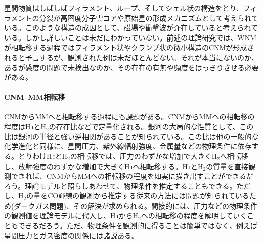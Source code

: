 星間物質はしばしばフィラメント、ループ、そしてシェル状の構造をとり、フィラメントの分裂が高密度分子雲コアや原始星の形成メカニズムとして考えられている。このような構造の成因として、磁場や衝撃波が介在していると考えられている。しかし詳しいことは未だにわかっていない。前述の理論研究\citep{2012ApJ...759...35I}では、WNMが相転移する過程ではフィラメント状やクランプ状の微小構造のCNMが形成されると予言するが、観測された例は未だほとんどない。それが本当にないのか、あるが感度の問題で未検出なのか、その存在の有無や頻度をはっきりさせる必要がある。

\paragraph{CNM--MM相転移}

CNMからMMへと相転移する過程にも課題がある。CNMからMMへの相転移の程度はH\,\textsc{i}とH$_{2}$の存在比などで定量化される。銀河の大局的な性質として、この比は銀河の半径と強い逆相関があることが知られている\citep{1995A&A...304....1H}。この比は他の一般的な化学進化と同様に、星間圧力、紫外線輻射強度、金属量などの物理条件に依存する。とりわけH\,\textsc{i}とH$_{2}$の相転移では、圧力のわずかな増加で大きくH$_{2}$へ相転移し、放射強度のわずかな増加で大きくH\,\textsc{i}へ相転移する\citep{1993ApJ...411..170E}。H\,\textsc{i}とH$_{2}$の質量を直接観測できれば、CNMからMMへの相転移の程度を如実に描き出すことができるだろう。理論モデルと照らしあわせて、物理条件を推定することもできる。ただし、H$_{2}$の量をCO輝線の観測から推定する従来の方法には問題が知られているため(ダークガス問題)、その解決が求められる。間接的には、圧力などの物理条件の観測値を理論モデルに代入し、H\,\textsc{i}からH$_{2}$への相転移の程度を解明していくこともできるだろう。ただ、物理条件を観測的に得ることは簡単ではなく、例えば星間圧力とガス密度の関係には諸説ある。

